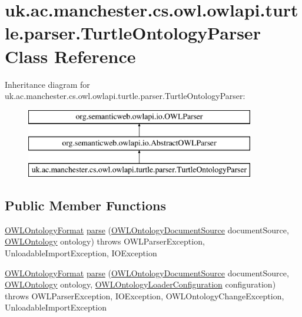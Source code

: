 \hypertarget{classuk_1_1ac_1_1manchester_1_1cs_1_1owl_1_1owlapi_1_1turtle_1_1parser_1_1_turtle_ontology_parser}{\section{uk.\-ac.\-manchester.\-cs.\-owl.\-owlapi.\-turtle.\-parser.\-Turtle\-Ontology\-Parser Class Reference}
\label{classuk_1_1ac_1_1manchester_1_1cs_1_1owl_1_1owlapi_1_1turtle_1_1parser_1_1_turtle_ontology_parser}
}
Inheritance diagram for uk.\-ac.\-manchester.\-cs.\-owl.\-owlapi.\-turtle.\-parser.\-Turtle\-Ontology\-Parser\-:\begin{figure}[H]
\begin{center}
\leavevmode
\includegraphics[height=3.000000cm]{classuk_1_1ac_1_1manchester_1_1cs_1_1owl_1_1owlapi_1_1turtle_1_1parser_1_1_turtle_ontology_parser}
\end{center}
\end{figure}
\subsection*{Public Member Functions}
\begin{DoxyCompactItemize}
\item 
\hyperlink{classorg_1_1semanticweb_1_1owlapi_1_1model_1_1_o_w_l_ontology_format}{O\-W\-L\-Ontology\-Format} \hyperlink{classuk_1_1ac_1_1manchester_1_1cs_1_1owl_1_1owlapi_1_1turtle_1_1parser_1_1_turtle_ontology_parser_a7325f7301fd0413757d68b7061017a93}{parse} (\hyperlink{interfaceorg_1_1semanticweb_1_1owlapi_1_1io_1_1_o_w_l_ontology_document_source}{O\-W\-L\-Ontology\-Document\-Source} document\-Source, \hyperlink{interfaceorg_1_1semanticweb_1_1owlapi_1_1model_1_1_o_w_l_ontology}{O\-W\-L\-Ontology} ontology)  throws O\-W\-L\-Parser\-Exception, Unloadable\-Import\-Exception, I\-O\-Exception 
\item 
\hyperlink{classorg_1_1semanticweb_1_1owlapi_1_1model_1_1_o_w_l_ontology_format}{O\-W\-L\-Ontology\-Format} \hyperlink{classuk_1_1ac_1_1manchester_1_1cs_1_1owl_1_1owlapi_1_1turtle_1_1parser_1_1_turtle_ontology_parser_a0f952a33b23d0399c5c01bce4415095f}{parse} (\hyperlink{interfaceorg_1_1semanticweb_1_1owlapi_1_1io_1_1_o_w_l_ontology_document_source}{O\-W\-L\-Ontology\-Document\-Source} document\-Source, \hyperlink{interfaceorg_1_1semanticweb_1_1owlapi_1_1model_1_1_o_w_l_ontology}{O\-W\-L\-Ontology} ontology, \hyperlink{classorg_1_1semanticweb_1_1owlapi_1_1model_1_1_o_w_l_ontology_loader_configuration}{O\-W\-L\-Ontology\-Loader\-Configuration} configuration)  throws O\-W\-L\-Parser\-Exception, I\-O\-Exception, O\-W\-L\-Ontology\-Change\-Exception, Unloadable\-Import\-Exception 
\end{DoxyCompactItemize}
